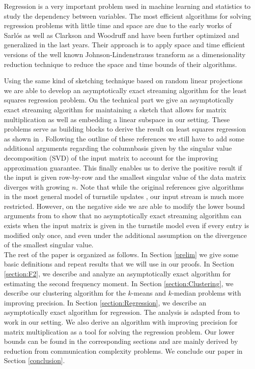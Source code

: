 \documentclass[a4paper,11pt,oneside,english,onecolumn]{article}
\theoremstyle{definition}
\begin{document}
Regression is a very important problem used in machine learning and statistics to study the dependency between variables. The most efficient algorithms for solving regression problems with little time and space are due to the early works of Sarl\'os \cite{ImpLinAlg} as well as Clarkson and Woodruff \cite{LinAlgStream} and have been further optimized and generalized in the last years. Their approach is to apply space and time efficient versions of the well known Johnson-Lindenstrauss transform \cite{JLT} as a dimensionality reduction technique to reduce the space and time bounds of their algorithms.

Using the same kind of sketching technique based on random linear projections we are able to develop an asymptotically exact streaming algorithm for the least squares regression problem. On the technical part we give an asymptotically exact streaming algorithm for maintaining a sketch that allows for matrix multiplication as well as embedding a linear subspace in our setting. These problems serve as building blocks to derive the result on least squares regression as shown in \cite{ImpLinAlg,LinAlgStream}. Following the outline of these references we still have to add some additional arguments regarding the columnbasis given by the singular value decomposition (SVD) of the input matrix to account for the improving approximation guarantee. This finally enables us to derive the positive result if the input is given row-by-row and the smallest singular value of the data matrix diverges with growing $n$. Note that while the original references give algorithms in the most general model of turnstile updates \cite{Muthukrishnan05}, our input stream is much more restricted. However, on the negative side we are able to modify the lower bound arguments from \cite{LinAlgStream} to show that no asymptotically exact streaming algorithm can exists when the input matrix is given in the turnstile model even if every entry is modified only once, and
even under the additional assumption on the divergence of the smallest singular value.\\

The rest of the paper is organized as follows. In Section \ref{prelim} we give some basic definitions and repeat results that we will use in our proofs. In Section \ref{section:F2}, we describe and analyze an asymptotically exact algorithm for estimating the second frequency moment. In Section \ref{section:Clustering}, we describe our clustering algorithm for the $k$-means and $k$-median problems with improving precision. In Section \ref{section:Regression}, we describe an asymptotically exact algorithm for regression. The analysis is adapted from \cite{LinAlgStream} to work in our setting. We also derive an algorithm with improving precision for matrix multiplication as a tool for solving the regression problem. Our lower bounds can be found in the corresponding sections and are mainly derived by reduction from communication complexity problems. We conclude our paper in Section \ref{conclusion}.
\end{document}

